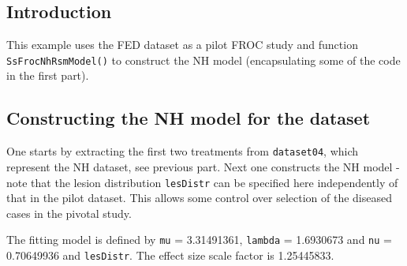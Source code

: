 \documentclass[
]{book}
\newenvironment{Shaded}{\begin{snugshade}}{\end{snugshade}}
\newcommand{\DataTypeTok}[1]{\textcolor[rgb]{0.13,0.29,0.53}{#1}}
\newcommand{\DecValTok}[1]{\textcolor[rgb]{0.00,0.00,0.81}{#1}}
\newcommand{\FloatTok}[1]{\textcolor[rgb]{0.00,0.00,0.81}{#1}}
\newcommand{\KeywordTok}[1]{\textcolor[rgb]{0.13,0.29,0.53}{\textbf{#1}}}
\newcommand{\NormalTok}[1]{#1}
\newcommand{\OperatorTok}[1]{\textcolor[rgb]{0.81,0.36,0.00}{\textbf{#1}}}
\newcommand{\StringTok}[1]{\textcolor[rgb]{0.31,0.60,0.02}{#1}}
\begin{document}
\hypertarget{introduction}{%
\subsection{Introduction}\label{introduction}}

This example uses the FED dataset as a pilot FROC study and function \texttt{SsFrocNhRsmModel()} to construct the NH model (encapsulating some of the code in the first part).

\hypertarget{constructing-the-nh-model-for-the-dataset}{%
\subsection{Constructing the NH model for the dataset}\label{constructing-the-nh-model-for-the-dataset}}

One starts by extracting the first two treatments from \texttt{dataset04}, which represent the NH dataset, see previous part. Next one constructs the NH model - note that the lesion distribution \texttt{lesDistr} can be specified here independently of that in the pilot dataset. This allows some control over selection of the diseased cases in the pivotal study.

\begin{Shaded}
\end{Shaded}

The fitting model is defined by \texttt{mu} = 3.31491361, \texttt{lambda} = 1.6930673 and \texttt{nu} = 0.70649936 and \texttt{lesDistr}. The effect size scale factor is 1.25445833.
\end{document}
